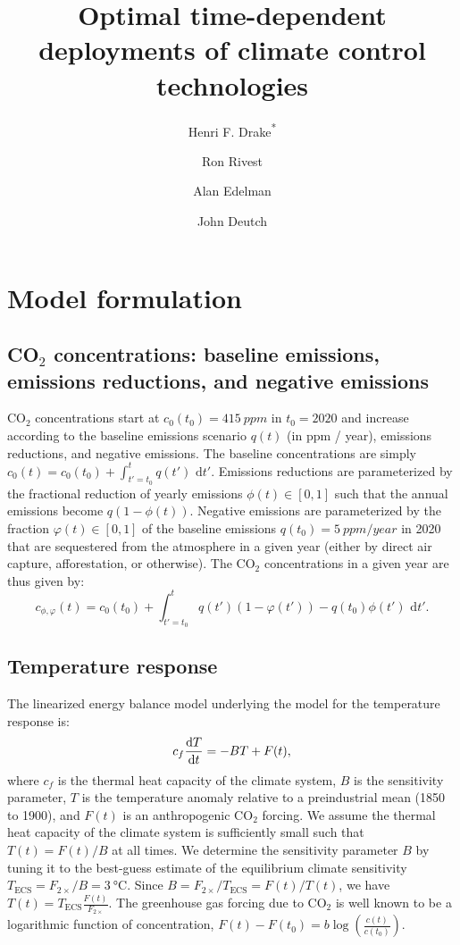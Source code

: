 \documentclass{article}
\title{Optimal time-dependent deployments of climate control technologies}
\author[1,2]{Henri F. Drake\textsuperscript{*}}
\author[1]{Ron Rivest}
\author[1]{Alan Edelman}
\author[1]{John Deutch}
\affil[1]{Massachusetts Institute of Technology, Cambridge, MA, USA}
\affil[2]{Woods Hole Oceanographic Institution, Woods Hole, MA, USA}
\date{}             %
\begin{document}
\maketitle

\section{Model formulation}

\subsection{CO$_{2}$ concentrations: baseline emissions, emissions reductions, and negative emissions}

CO$_{2}$ concentrations start at $c_{0}(t_{0}) = \SI{415}{ppm}$ in $t_{0}=2020$ and increase according to the baseline emissions scenario $q(t)$ (in ppm / year), emissions reductions, and negative emissions. The baseline concentrations are simply $c_{0}(t) = c_{0}(t_{0}) + \int_{t'=t_{0}}^{t} q(t') \text{ d}t'$. Emissions reductions are parameterized by the fractional reduction of yearly emissions $\phi(t) \in [0,1]$ such that the annual emissions become $q(1-\phi(t))$. Negative emissions are parameterized by the fraction $\varphi(t) \in [0,1]$ of the baseline emissions $q(t_{0}) = \SI{5}{ppm/year}$ in 2020 that are sequestered from the atmosphere in a given year (either by direct air capture, afforestation, or otherwise). The CO$_{2}$ concentrations in a given year are thus given by:
\begin{equation}
    c_{\phi, \varphi}(t) = c_{0}(t_{0}) + \int_{t'=t_{0}}^{t} q(t')(1-\varphi(t')) - q(t_{0}) \phi(t') \text{ d}t'.\label{eq-CO2-conc}
\end{equation}

\subsection{Temperature response}
The linearized energy balance model underlying the model for the temperature response is:
\begin{equation}
    c_{f} \dv{T}{t} = -BT + F(t),
\end{equation}
where $c_{f}$ is the thermal heat capacity of the climate system, $B$ is the sensitivity parameter, $T$ is the temperature anomaly relative to a preindustrial mean (1850 to 1900), and $F(t)$ is an anthropogenic CO$_{2}$ forcing. We assume the thermal heat capacity of the climate system is sufficiently small such that $T(t)=F(t)/B$ at all times. We determine the sensitivity parameter $B$ by tuning it to the best-guess estimate of the equilibrium climate sensitivity $T_{\text{ECS}} = F_{2\times}/B = \SI{3}{\celsius}$. Since $B = F_{2\times}/T_{\text{ECS}} = F(t)/T(t)$, we have $T(t) = T_{\text{ECS}} \frac{F(t)}{F_{2\times}}$. The greenhouse gas forcing due to CO$_{2}$ is well known to be a logarithmic function of concentration, $F(t)-F(t_{0}) = b \log(\frac{c(t)}{c(t_{0})})$.
\end{document}
